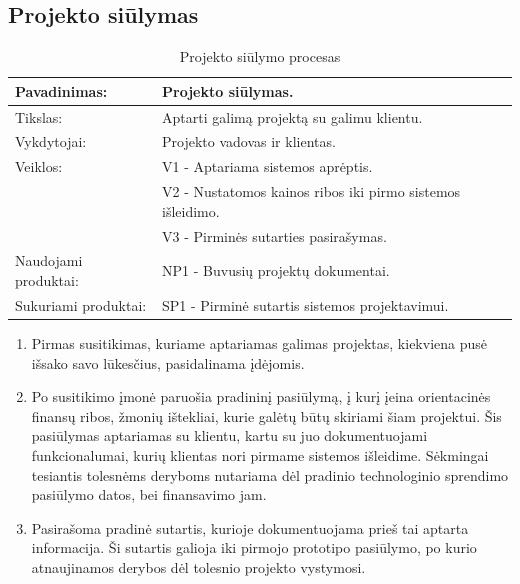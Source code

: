 \documentclass{VUMIFPSkursinis}
\begin{document}
	\newpage

	\subsection{Projekto siūlymas}
	\begin{center}
		\begin{table}[ht]
			\caption{Projekto siūlymo procesas}
			\begin{tabular}{ | l | l | }
				\hline
				Pavadinimas:		& Projekto siūlymas.						\\ \hline
				Tikslas:		& Aptarti galimą projektą su galimu klientu.			\\ \hline
				Vykdytojai:		& Projekto vadovas ir klientas.					\\ \hline
				Veiklos:		& V1 - Aptariama sistemos aprėptis. 				\\
							& V2 - Nustatomos kainos ribos iki pirmo sistemos išleidimo.	\\
							& V3 - Pirminės sutarties pasirašymas.				\\ \hline
				Naudojami produktai:	& NP1 - Buvusių projektų dokumentai. 				\\ \hline
				Sukuriami produktai:	& SP1 - Pirminė sutartis sistemos projektavimui.		\\ \hline
			\end{tabular}
		\end{table}
	\end{center}

	\begin{enumerate}
		\item{Pirmas susitikimas, kuriame aptariamas galimas projektas, kiekviena pusė išsako savo lūkesčius, pasidalinama įdėjomis.}
		\item{
			Po susitikimo įmonė paruošia pradininį pasiūlymą, į kurį įeina orientacinės finansų ribos, žmonių ištekliai, kurie galėtų būtų skiriami šiam projektui.
			Šis pasiūlymas aptariamas su klientu, kartu su juo dokumentuojami funkcionalumai, kurių klientas nori pirmame sistemos išleidime.
			Sėkmingai tesiantis tolesnėms deryboms nutariama dėl pradinio technologinio sprendimo pasiūlymo datos, bei finansavimo jam.
		}
		\item{
			Pasirašoma pradinė sutartis, kurioje dokumentuojama prieš tai aptarta informacija.
			Ši sutartis galioja iki pirmojo prototipo pasiūlymo, po kurio atnaujinamos derybos dėl tolesnio projekto vystymosi.
		}
	\end{enumerate}
\end{document}
